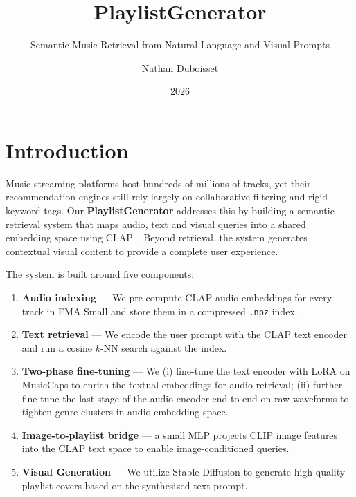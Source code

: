 \documentclass[11pt]{article}
\author{Nathan Duboisset}
\date{2026}
\title{PlaylistGenerator}
\subtitle{Semantic Music Retrieval from Natural Language and Visual Prompts}
\begin{document}
\maketitle

\tableofcontents

\newpage

\section{Introduction}

Music streaming platforms host hundreds of millions of tracks, yet their recommendation
engines still rely largely on collaborative filtering and rigid keyword tags.
Our \textbf{PlaylistGenerator} addresses this by building a semantic retrieval system that
maps audio, text and visual queries into a shared embedding space using CLAP~\cite{elizalde2023clap}. Beyond retrieval, the system generates contextual visual content to provide a complete user experience.

The system is built around five components:
\begin{enumerate}
    \item \textbf{Audio indexing} --- We pre-compute CLAP audio embeddings for every track
          in FMA Small and store them in a compressed \texttt{.npz} index.
    \item \textbf{Text retrieval} --- We encode the user prompt with the CLAP text encoder
          and run a cosine $k$-NN search against the index.
    \item \textbf{Two-phase fine-tuning} --- We (i) fine-tune the text encoder with LoRA on
          MusicCaps to enrich the textual embeddings for audio retrieval; (ii) further fine-tune the last stage of the audio encoder
          end-to-end on raw waveforms to tighten genre clusters in audio embedding space.
    \item \textbf{Image-to-playlist bridge} --- a small MLP projects CLIP image features
          into the CLAP text space to enable image-conditioned queries.
    \item \textbf{Visual Generation} --- We utilize Stable Diffusion to generate high-quality playlist covers based on the synthesized text prompt.
\end{enumerate}

\end{document}
